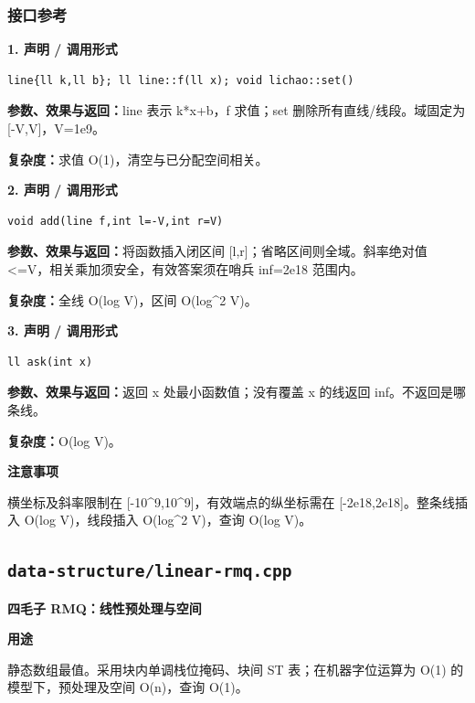 \documentclass[UTF8,a4paper,10pt]{ctexart}
\newcommand{\TemplUsage}[1]{\textbf{用途}\par #1\par}
\newcommand{\TemplNote}[1]{\textbf{注意事项}\par #1\par}
\begin{document}
\subsubsection*{接口参考}
\noindent\begin{minipage}{\textwidth}
\textbf{1. 声明 / 调用形式}
\begin{lstlisting}
line{ll k,ll b}; ll line::f(ll x); void lichao::set()
\end{lstlisting}
\textbf{参数、效果与返回：}line 表示 k*x+b，f 求值；set 删除所有直线/线段。域固定为 [-V,V]，V=1e9。

\textbf{复杂度：}求值 O(1)，清空与已分配空间相关。

\end{minipage}\par\vspace{0.4em}
\noindent\begin{minipage}{\textwidth}
\textbf{2. 声明 / 调用形式}
\begin{lstlisting}
void add(line f,int l=-V,int r=V)
\end{lstlisting}
\textbf{参数、效果与返回：}将函数插入闭区间 [l,r]；省略区间则全域。斜率绝对值<=V，相关乘加须安全，有效答案须在哨兵 inf=2e18 范围内。

\textbf{复杂度：}全线 O(log V)，区间 O(log\textasciicircum{}2 V)。

\end{minipage}\par\vspace{0.4em}
\noindent\begin{minipage}{\textwidth}
\textbf{3. 声明 / 调用形式}
\begin{lstlisting}
ll ask(int x)
\end{lstlisting}
\textbf{参数、效果与返回：}返回 x 处最小函数值；没有覆盖 x 的线返回 inf。不返回是哪条线。

\textbf{复杂度：}O(log V)。

\TemplNote{横坐标及斜率限制在 [-10\textasciicircum{}9,10\textasciicircum{}9]，有效端点的纵坐标需在 [-2e18,2e18]。整条线插入 O(log V)，线段插入 O(log\textasciicircum{}2 V)，查询 O(log V)。}
\end{minipage}\par\vspace{0.4em}
\clearpage
\subsection{\texttt{data-structure/linear-rmq.cpp}}
\textbf{四毛子 RMQ：线性预处理与空间}\par
\TemplUsage{静态数组最值。采用块内单调栈位掩码、块间 ST 表；在机器字位运算为 O(1) 的模型下，预处理及空间 O(n)，查询 O(1)。}
\end{document}
